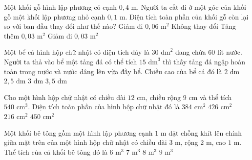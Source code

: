 \begin{ex} %
Một khối gỗ hình lập phương có cạnh $0{,}4\text{ m}$. Người ta cắt đi ở một góc của khối gỗ một khối lập phương nhỏ cạnh $0{,}1\text{ m}$. Diện tích toàn phần của khối gỗ còn lại so với ban đầu thay đổi như thế nào?
\choice
{Giảm đi $0{,}06\text{ m}^2$}
{\True Không thay đổi}
{Tăng thêm $0{,}03\text{ m}^2$}
{Giảm đi $0{,}03\text{ m}^2$}
\end{ex}

\begin{ex} %
Một bể cá hình hộp chữ nhật có diện tích đáy là $30\text{ dm}^2$ đang chứa $60\text{ lít}$ nước. Người ta thả vào bể một tảng đá có thể tích $15\text{ dm}^3$ thì thấy tảng đá ngập hoàn toàn trong nước và nước dâng lên vừa đầy bể. Chiều cao của bể cá đó là
\choice
{$2\text{ dm}$}
{\True $2{,}5\text{ dm}$}
{$3\text{ dm}$}
{$3{,}5\text{ dm}$}
\end{ex}

\begin{ex} %
Cho một hình hộp chữ nhật có chiều dài $12\text{ cm}$, chiều rộng $9\text{ cm}$ và thể tích $540\text{ cm}^3$. Diện tích toàn phần của hình hộp chữ nhật đó là
\choice
{$384\text{ cm}^2$}
{\True $426\text{ cm}^2$}
{$216\text{ cm}^2$}
{$450\text{ cm}^2$}
\end{ex}

\begin{ex} %
Một khối bê tông gồm một hình lập phương cạnh $1\text{ m}$ đặt chồng khít lên chính giữa mặt trên của một hình hộp chữ nhật có chiều dài $3\text{ m}$, rộng $2\text{ m}$, cao $1\text{ m}$. Thể tích của cả khối bê tông đó là
\choice
{$6\text{ m}^3$}
{\True $7\text{ m}^3$}
{$8\text{ m}^3$}
{$9\text{ m}^3$}
\end{ex}

